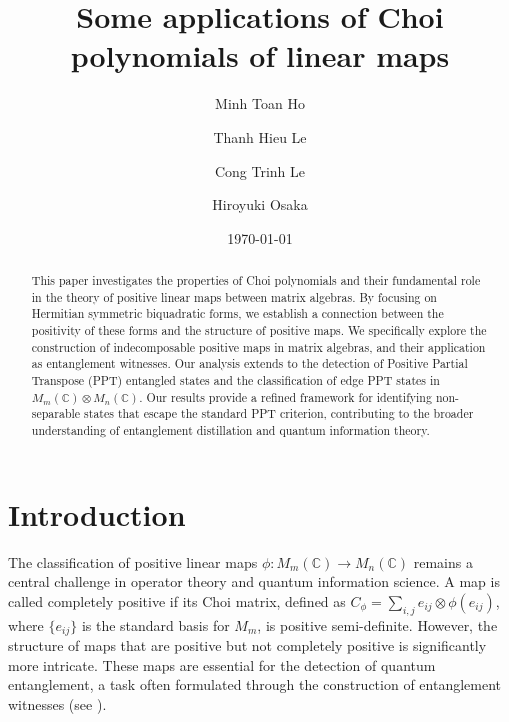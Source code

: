 \documentclass[12pt,a4paper]{amsart}
\theoremstyle{plain}
\theoremstyle{remark}
\theoremstyle{definition}
\begin{document}
	\title{Some applications of Choi polynomials of linear maps}
	\author{Minh Toan Ho}
	\address{Institute of Mathematics, VAST, 18 Hoang Quoc Viet, Hanoi, Vietnam}

\author{Thanh Hieu Le}
\address{Department of Mathematics and Statistics, Quy Nhon University, 
	170 An Duong Vuong, Quy Nhon Nam Ward, Gia Lai, Vietnam}

\author{Cong Trinh Le}
\address{Department of Mathematics and Statistics, Quy Nhon University, 
	170 An Duong Vuong, Quy Nhon Nam Ward, Gia Lai, Vietnam}

\author{Hiroyuki Osaka}
\address{Department of Mathematical Sciences, Ritsumeikan University, Kusatsu, Shiga 525-8577, Japan}

\date{ \today}


\maketitle

\begin{abstract}
	This paper investigates the properties of Choi polynomials and their fundamental role in the theory of positive linear maps between matrix algebras. By focusing on Hermitian symmetric biquadratic forms, we establish a connection between the positivity of these forms and the structure of positive maps. We specifically explore the construction of indecomposable positive maps in matrix algebras, and their application as entanglement witnesses. Our analysis extends to the detection of Positive Partial Transpose (PPT) entangled states and the classification of edge PPT states in $M_m(\mathbb{C}) \otimes M_n(\mathbb{C})$. Our results provide a refined framework for identifying non-separable states that escape the standard PPT criterion, contributing to the broader understanding of entanglement distillation and quantum information theory.
\end{abstract}


\section{Introduction}

The classification of positive linear maps $\phi: M_m(\mathbb{C}) \to M_n(\mathbb{C})$ remains a central challenge in operator theory and quantum information science. A map is called completely positive if its Choi matrix, defined as $C_{\phi} = \sum_{i,j} e_{ij} \otimes \phi(e_{ij})$, where $\{e_{ij}\}$ is the standard basis for $M_m$, is positive semi-definite. However, the structure of maps that are positive but not completely positive is significantly more intricate. These maps are essential for the detection of quantum entanglement, a task often formulated through the construction of entanglement witnesses (see \cite{Horodecki2009,Keybook}).
\end{document}
